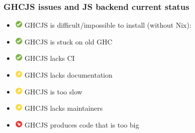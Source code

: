\documentclass[aspectratio=169]{beamer}
\begin{document}
\begin{frame}
\frametitle{GHCJS issues and JS backend current status}
\begin{itemize}
\item[]
\includegraphics[height=1em]{images/check_green.png}
GHCJS is difficult/impossible to install (without Nix):

\item[]
\includegraphics[height=1em]{images/check_green.png}
GHCJS is stuck on old GHC

\item[]
\includegraphics[height=1em]{images/check_green.png}
GHCJS lacks CI

\item[]
\includegraphics[height=1em]{images/arrow-up-right-yellow.png}
GHCJS lacks documentation

\item[]
\includegraphics[height=1em]{images/arrow-up-right-yellow.png}
GHCJS is too slow

\item[]
\includegraphics[height=1em]{images/arrow-up-right-yellow.png}
GHCJS lacks maintainers

\item[]
\includegraphics[height=1em]{images/arrow-down-right-red.svg.png}
GHCJS produces code that is too big

\end{itemize}
\end{frame}
\end{document}
